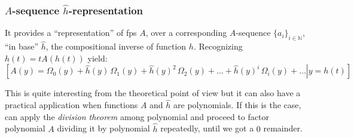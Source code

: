 
\subsubsection{$A$-sequence $\hat{h}$-representation}

It provides a ``representation'' of \ac{fps} $A$, over a corresponding
$A$-sequence $\lbrace a_{i}\rbrace_{i\in\mathbb{N}}$, ``in base'' $\hat{h}$, 
the compositional inverse of function $h$.  Recognizing $h(t)=tA(h(t))$ yield:
\begin{displaymath}
    \left.\left[
        A(y) =  \Omega_{0}(y) + 
        \hat{h}(y)\,\Omega_{1}(y) + \hat{h}(y)^{2}\,\Omega_{2}(y) + \ldots +
        \hat{h}(y)^{i}\,\Omega_{i}(y) + \ldots
        \right| y = h(t) \right]
\end{displaymath}

This is quite interesting from the theoretical point of 
view but it can also have a practical application
when functions $A$ and $\hat{h}$ are polynomials. If this is the case,
can apply the \emph{division theorem} among polynomial and 
proceed to factor polynomial $A$ dividing it by polynomial $\hat{h}$
repeatedly, until we got a $0$ remainder.

